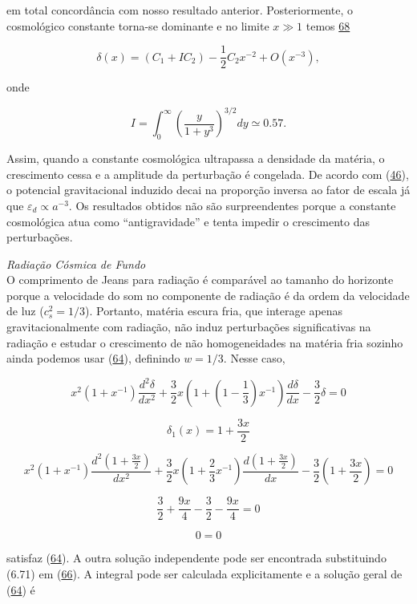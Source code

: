 \documentclass[a4paper,12pt]{article}
\begin{document}
em total concordância com nosso resultado anterior. Posteriormente, o cosmológico
constante torna-se dominante e no limite $x \gg 1$ temos \hyperref[eq68]{68}

\begin{equation}\label{eq69}
	\delta (x) = (C_1 + I C_2) -\frac{1}{2}C_2x^{-2} + O (x^{-3}),
\end{equation}

onde 

\begin{equation}\label{eq70}
	I = \int_{0}^{\infty} \left( \dfrac{y}{1+y^3}\right)^{3/2} dy \simeq 0.57 .
\end{equation}

Assim, quando a constante cosmológica ultrapassa a densidade da matéria, o crescimento cessa e a amplitude da perturbação é congelada. De acordo com (\hyperref[eq46]{46}), o potencial gravitacional induzido decai na proporção inversa ao fator de escala já que $\varepsilon_d \propto a^{-3}.$ Os resultados obtidos não são surpreendentes porque a constante cosmológica atua como “antigravidade” e tenta impedir o crescimento das perturbações.
\newline

\textit{Radiação Cósmica de Fundo} \\O comprimento de Jeans para radiação é comparável ao tamanho do horizonte porque a velocidade do som no componente de radiação é da ordem da velocidade de luz ($c^2_s = 1/3$). Portanto, matéria escura fria, que interage apenas gravitacionalmente com radiação, não induz perturbações significativas na radiação e estudar o crescimento de não homogeneidades na matéria fria sozinho ainda podemos usar (\hyperref[eq64]{64}), definindo $w = 1/3$. Nesse caso,

$$x^2 (1+x^{-1})\dfrac{d^2\delta}{dx^2} + \dfrac{3}{2}x(1+ (1-\frac{1}{3})x^{-1})\dfrac{d\delta}{dx} - \dfrac{3}{2}\delta = 0$$

\begin{equation}\label{eq71}
	\delta_1 (x) = 1+ \frac{3x}{2}
\end{equation}

$$x^2 (1+x^{-1})\dfrac{d^2\left(1+ \frac{3x}{2}\right)}{dx^2} + \dfrac{3}{2}x(1+ \frac{2}{3}x^{-1})\dfrac{d\left(1+ \frac{3x}{2}\right)}{dx} - \dfrac{3}{2}\left(1+ \frac{3x}{2}\right) = 0$$

$$ \dfrac{3}{2}+\dfrac{9x}{4} - \dfrac{3}{2} - \dfrac{9x}{4} = 0$$

$$ 0=0$$

satisfaz (\hyperref[eq64]{64}). A outra solução independente pode ser encontrada substituindo (6.71)
em (\hyperref[eq66]{66}). A integral pode ser calculada explicitamente e a solução geral de (\hyperref[eq64]{64}) é
\end{document}
